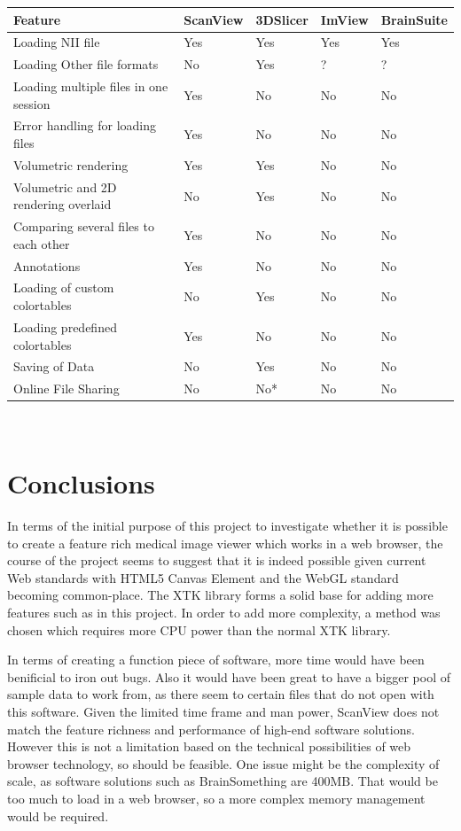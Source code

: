 \documentclass[a4paper,11pt,titlepage]{article}
\begin{document}
\begin{center}

  \begin{tabular}{ | l | l | l | l | l |}
    \hline
    Feature & ScanView & 3DSlicer & ImView & BrainSuite \\ \hline \hline

Loading NII file & Yes & Yes & Yes & Yes\\ \hline
Loading Other file formats & No & Yes & ? & ?\\ \hline
Loading multiple files in one session & Yes & No & No & No \\ \hline
Error handling for loading files & Yes & No & No & No\\ \hline
Volumetric rendering & Yes & Yes & No & No\\ \hline
Volumetric and 2D rendering overlaid & No & Yes & No & No \\ \hline
Comparing several files to each other & Yes & No & No & No\\ \hline
Annotations & Yes & No & No & No\\ \hline
Loading of custom colortables & No & Yes & No & No \\ \hline
Loading predefined colortables & Yes & No & No & No\\ \hline
Saving of Data & No & Yes & No & No\\ \hline
Online File Sharing & No & No* & No & No\\ \hline

  \end{tabular}\\


\end{center}

\section{Conclusions}

In terms of the initial purpose of this project to investigate whether it is possible to create a feature rich medical image viewer which works in a web browser, the course of the project seems to suggest that it is indeed possible given current Web standards with HTML5 Canvas Element and the WebGL standard becoming common-place. The XTK library forms a solid base for adding more features such as in this project. In order to add more complexity, a method was chosen which requires more CPU power than the normal XTK library.

In terms of creating a function piece of software, more time would have been benificial to iron out bugs. Also it would have been great to have a bigger pool of sample data to work from, as there seem to certain files that do not open with this software. Given the limited time frame and man power, ScanView does not match the feature richness and performance of high-end software solutions. However this is not a limitation based on the technical possibilities of web browser technology, so should be feasible. One issue might be the complexity of scale, as software solutions such as BrainSomething are 400MB. That would be too much to load in a web browser, so a more complex memory management would be required.
\end{document}
